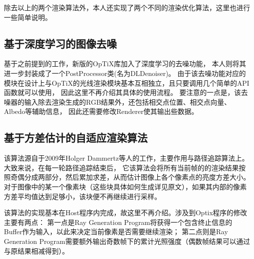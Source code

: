 除去以上的两个渲染算法外，本人还实现了两个不同的渲染优化算法，这里也进行一些简单说明。

\subsection{基于深度学习的图像去噪}

基于之前提到的工作\cite{NvidiaDenoiser}，新版的OpTiX库加入了深度学习的去噪功能，
本人则将其进一步封装成了一个PostProcessor类(名为DLDenoiser)。
由于该去噪功能对应的模块在设计上与OpTiX的光线渲染模块基本互相独立，且只要调用几个简单的API函数就可以使用，
因此这里不再介绍其具体的使用流程。
要注意的一点是，该去噪器的输入除去渲染生成的RGB结果外，还包括相交点位置、相交点向量、Albedo等辅助信息，
因此还需要修改Renderer使其输出些数据。

\subsection{基于方差估计的自适应渲染算法}

该算法源自于2009年Holger Dammertz等人的工作\cite{AdaptiveSampling}，主要作用与路径追踪算法上。
大致来说，在每一轮路径追踪结束后，
它该算法会将所有当前帧的的渲染结果按照奇偶分成两部分，然后累加求差，从而估计图像上各个像素点的亮度方差大小。
对于图像中的某一个像素块（这些块具体如何生成详见原文），如果其内部的像素方差平均值达到足够小，该块便不再继续进行采样。

该算法的实现基本在Host程序内完成，故这里不再介绍。涉及到Optix程序的修改主要有两点：
第一点是Ray Generation Program将获得一个包含终止信息的Buffer作为输入，以此来决定当前像素是否需要继续渲染；
第二点则是Ray Generation Program需要额外输出奇数帧下的累计光照强度（偶数帧结果可以通过与原结果相减得到）。

